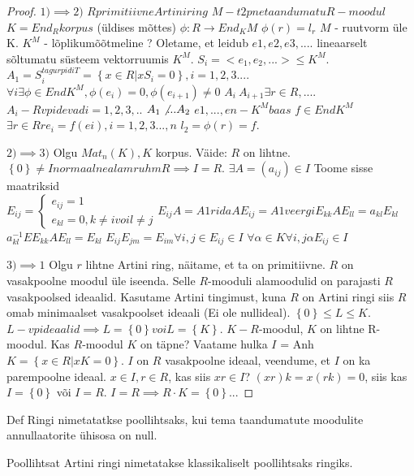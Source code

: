 \documentclass[12pt]{report}
\numberwithin{equation}{section}
\theoremstyle{definition}
\theoremstyle{plain}
\begin{document}
\begin{proof}
$1) \implies 2)$
$R primitiivne Artini ring$
$M - t2pne taandumatu R-moodul$
$K = End_R  korpus$ (\"uldises mõttes)
$\phi: R \to End_K M$
$\phi(r) = l_r$
$M $ - ruutvorm \"ule K.
$K^M$ - lõplikumõõtmeline ?
Oletame, et leidub $e1,e2,e3,.... $ lineaarselt sõltumatu s\"usteem vektorruumis $K^M$. 
$S_i=<e_1,e_2,...> \leq K^M$.
$A_1 = S_i^{tagurpidiT} = \left\lbrace x \in R | x S_i = 0 \right\rbrace , i = 1,2,3....$
$\forall i \exists \phi \in End K^M , \phi(e_i) = 0, \phi(e_{i+1}) \neq 0$
$A_i \ A_{i+1} \exists r \in R, ....$
$A_i - R vpidevad i=1,2,3,..$
$A_1 \not ... A_2 $
$e1,...,en - K^M baas$
$f \in End K^M$
$\exists r \in R r e_i = f(ei), i=1,2,3...,n$
$l_2 = \phi(r)=f$.

$2) \implies 3)$
Olgu $Mat_n(K), K$ korpus.
Väide: $R$ on lihtne.
$\left\lbrace 0 \right\rbrace \neq I normaalnealamruhm R \implies I = R$.
$\exists A = (a_{ij}) \in I$
Toome sisse maatriksid $E_{ij} =
\begin{cases}
e_{ij} = 1 \\
e_{kl} = 0, k \neq i voi l \neq j
\end{cases}
E_{ij}A = A 1 rida
AE_{ij} = A 1 veergi
E_{kk}AE_{ll} = a_{kl}E_{kl}$
$a^{-1}_{kl}EE_{kk}AE_{ll} = E_{kl}$
$E_{ij}E_{jm}=E_{im} \forall i,j \in E_{ij} \in I$
$\forall \alpha \in K \forall i,j \alpha E_{ij} \in I$

$3) \implies 1$
Olgu $r$ lihtne Artini ring, näitame, et ta on primitiivne.
$R$ on vasakpoolne moodul \"ule iseenda. Selle $R$-mooduli alamoodulid on parajasti $R$ vasakpoolsed ideaalid. Kasutame Artini tingimust, kuna $R$ on Artini ringi siis $R$ omab minimaalset vasakpoolset ideaali (Ei ole nullideal). $\left\lbrace 0 \right\rbrace \leq L \leq K$. $L - vp ideaalid \implies L = \left\lbrace 0 \right\rbrace voi L = \left\lbrace K \right\rbrace$.
$K - R$-moodul, $K$ on lihtne R-moodul. Kas $R$-moodul $K$ on täpne? Vaatame hulka $I$ = Anh$K = \left\lbrace x \in R | x K = 0 \right\rbrace$. $I$ on $R$ vasakpoolne ideaal, veendume, et $I$ on ka parempoolne ideaal. $x \in I, r \in R$, kas siis $xr \in I$? $(xr)k = x(rk) = 0$, siis kas $I = \left\lbrace 0 \right\rbrace$ või $I = R$. $I = R \implies R \cdot K = \left\lbrace 0 \right\rbrace$...
\end{proof}

Def Ringi nimetatatkse poollihtsaks, kui tema taandumatute moodulite annullaatorite \"uhisosa on null.

Poollihtsat Artini ringi nimetatakse klassikaliselt poollihtsaks ringiks.
\end{document}
